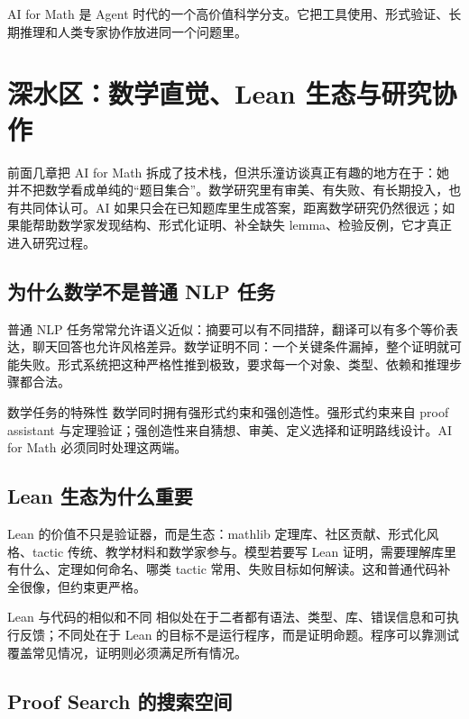 \documentclass[a4paper]{article}
\begin{document}
AI for Math 是 Agent 时代的一个高价值科学分支。它把工具使用、形式验证、长期推理和人类专家协作放进同一个问题里。


\section{深水区：数学直觉、Lean 生态与研究协作}

前面几章把 AI for Math 拆成了技术栈，但洪乐潼访谈真正有趣的地方在于：她并不把数学看成单纯的“题目集合”。数学研究里有审美、有失败、有长期投入，也有共同体认可。AI 如果只会在已知题库里生成答案，距离数学研究仍然很远；如果能帮助数学家发现结构、形式化证明、补全缺失 lemma、检验反例，它才真正进入研究过程。

\subsection{为什么数学不是普通 NLP 任务}

普通 NLP 任务常常允许语义近似：摘要可以有不同措辞，翻译可以有多个等价表达，聊天回答也允许风格差异。数学证明不同：一个关键条件漏掉，整个证明就可能失败。形式系统把这种严格性推到极致，要求每一个对象、类型、依赖和推理步骤都合法。

\begin{importantbox}{数学任务的特殊性}
数学同时拥有强形式约束和强创造性。强形式约束来自 proof assistant 与定理验证；强创造性来自猜想、审美、定义选择和证明路线设计。AI for Math 必须同时处理这两端。
\end{importantbox}

\subsection{Lean 生态为什么重要}

Lean 的价值不只是验证器，而是生态：mathlib 定理库、社区贡献、形式化风格、tactic 传统、教学材料和数学家参与。模型若要写 Lean 证明，需要理解库里有什么、定理如何命名、哪类 tactic 常用、失败目标如何解读。这和普通代码补全很像，但约束更严格。

\begin{knowledgebox}{Lean 与代码的相似和不同}
相似处在于二者都有语法、类型、库、错误信息和可执行反馈；不同处在于 Lean 的目标不是运行程序，而是证明命题。程序可以靠测试覆盖常见情况，证明则必须满足所有情况。
\end{knowledgebox}

\subsection{Proof Search 的搜索空间}
\end{document}
